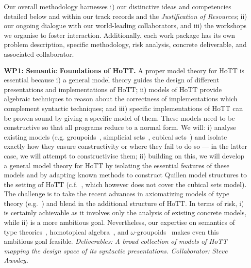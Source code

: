\documentclass[a4paper,11pt]{article}
\begin{document}
Our overall methodology harnesses i) our distinctive ideas and
competencies detailed below and within  our track records and
the {\em Justification of Resources}; ii) our ongoing dialogue with
our world-leading collaborators, and iii) the workshops we 
organise to foster interaction. Additionally, each work package has
its own problem description, specific methodology, risk analysis, 
concrete deliverable, and  associated collaborator. 


{\bf WP1: Semantic Foundations of HoTT.}  A proper model theory for
HoTT is essential because i) a general model theory guides the design
of different presentations and implementations of HoTT; ii) models of
HoTT provide algebraic techniques to reason about the correctness of
implementations which complement syntactic techniques; and iii)
specific implementations of HoTT can be proven sound by giving a
specific model of them.  These models need to be constructive so that
all programs reduce to a normal form.  We will: i) analyse existing
models ({e.g.}  groupoids~\cite{HofmannM:groitt}, simplicial
sets~\cite{KapulkinC:simmuv}, cubical sets~\cite{BezemM:cubsmt}) and
isolate exactly how they ensure constructivity or where they fail to
do so --- in the latter case, we will attempt to constructivise them;
ii) building on this, we will develop a general model theory for HoTT
by isolating the essential features of these models and by adapting
known methods to construct Quillen model structures to the setting of
HoTT ({c.f.}~\cite{ShulmanM:uniidh}, which however does not cover the
cubical sets model).  The challenge is to take the recent advances in
axiomatizing models of type theory ({e.g.}~\cite{AwodeyS:natmtt}) and
blend in the additional structure of HoTT. In terms of risk, i) is
certainly achievable as it involves only the analysis of existing
concrete models, while ii) is a more ambitious goal. Nevertheless, our
expertise on semantics of type theories~\cite{neil2014relParamDep},
homotopical algebra~\cite{GambinoN:homl2c,GambinoN:weilsh}, and
$\omega$-groupoids~\cite{alti:csl12} makes even this ambitious goal
feasible. {\em Deliverables: A broad collection of models of HoTT
  mapping the design space of its syntactic presentations.
  Collaborator: Steve Awodey.  }
\end{document}
